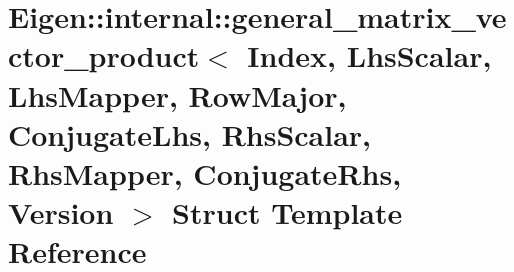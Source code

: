 \hypertarget{struct_eigen_1_1internal_1_1general__matrix__vector__product_3_01_index_00_01_lhs_scalar_00_01_l24320a1e63993864008333cadda60258}{}\section{Eigen\+::internal\+::general\+\_\+matrix\+\_\+vector\+\_\+product$<$ Index, Lhs\+Scalar, Lhs\+Mapper, Row\+Major, Conjugate\+Lhs, Rhs\+Scalar, Rhs\+Mapper, Conjugate\+Rhs, Version $>$ Struct Template Reference}
\label{struct_eigen_1_1internal_1_1general__matrix__vector__product_3_01_index_00_01_lhs_scalar_00_01_l24320a1e63993864008333cadda60258}
